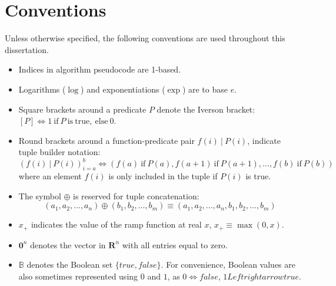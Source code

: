 \chapter*{Conventions}
Unless otherwise specified, the following conventions are used throughout this dissertation.

\begin{itemize}
  \item Indices in algorithm pseudocode are 1-based.
  \item Logarithms ($\log$) and exponentiations ($\exp$) are to base $e$.
  \item Square brackets around a predicate $P$ denote the Iverson bracket: $\left[P\right] \Leftrightarrow 1\ \mathrm{if}\ P \mathrm{~is~true,~else}\ 0$.
  \item Round brackets around a function-predicate pair $f(i)~|~P(i)$, indicate tuple builder notation: 
  \[
  \left(f(i)~|~P(i)\right)_{i=a}^b \Leftrightarrow \left( f(a)~\mathrm{if}~P(a), f(a+1)~\mathrm{if}~P(a+1), \dots, f(b)~\mathrm{if}~P(b) \right)
  \]
  where an element $f(i)$ is only included in the tuple if $P(i)$ is true.
  \item The symbol $\oplus$ is reserved for tuple concatenation: 
  \[
  \left(a_1, a_2, \dots, a_n\right) \oplus \left(b_1, b_2, \dots, b_m\right) \equiv \left(a_1, a_2, \dots, a_n, b_1, b_2, \dots, b_m\right)
  \]
  \item $x_+$ indicates the value of the ramp function at real $x$, $x_+ \equiv \max(0, x)$.
  \item $\mathbf{0}^n$ denotes the vector in $\mathbf{R}^n$ with all entries equal to zero.
  \item $\mathbb{B}$ denotes the Boolean set $\{true, false\}$.  For convenience, Boolean values are also sometimes represented using $0$ and $1$, as $0 \Leftrightarrow false$, $1 Leftrightarrow true$.
\end{itemize}
                                                                 